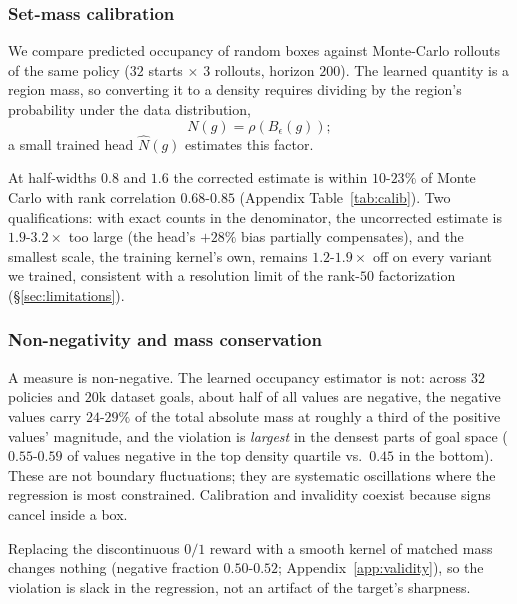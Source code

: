 \documentclass{article}
\newcommand{\Nhat}{\hat N}
\begin{document}
\subsubsection{Set-mass calibration}
\label{sec:set-calibration}

We compare predicted occupancy of random boxes against Monte-Carlo rollouts of the same policy ($32$ starts $\times$ $3$ rollouts, horizon $200$).
The learned quantity is a region mass, so converting it to a density requires dividing by the region's probability under the data distribution,
\begin{equation}
N(g)=\rho(B_\epsilon(g));
\end{equation}
a small trained head $\Nhat(g)$ estimates this factor.

At half-widths $0.8$ and $1.6$ the corrected estimate is within $10$-$23\%$ of Monte Carlo with rank correlation $0.68$-$0.85$ (Appendix Table~\ref{tab:calib}).
Two qualifications: with exact counts in the denominator, the uncorrected estimate is $1.9$-$3.2\times$ too large (the head's $+28\%$ bias partially compensates), and the smallest scale, the training kernel's own, remains $1.2$-$1.9\times$ off on every variant we trained, consistent with a resolution limit of the rank-$50$ factorization (\S\ref{sec:limitations}).

\subsubsection{Non-negativity and mass conservation}
\label{sec:nonneg}

A measure is non-negative.
The learned occupancy estimator is not: across $32$ policies and $20$k dataset goals, about half of all values are negative, the negative values carry $24$-$29\%$ of the total absolute mass at roughly a third of the positive values' magnitude, and the violation is \emph{largest} in the densest parts of goal space ($0.55$-$0.59$ of values negative in the top density quartile vs.\ $0.45$ in the bottom).
These are not boundary fluctuations; they are systematic oscillations where the regression is most constrained.
Calibration and invalidity coexist because signs cancel inside a box.

Replacing the discontinuous $0/1$ reward with a smooth kernel of matched mass changes nothing (negative fraction $0.50$-$0.52$; Appendix~\ref{app:validity}), so the violation is slack in the regression, not an artifact of the target's sharpness.
\end{document}
